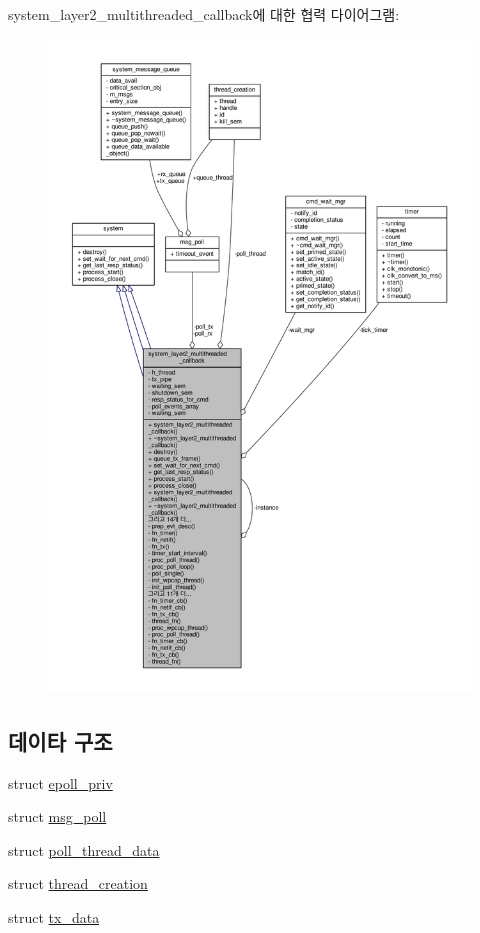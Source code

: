 system\+\_\+layer2\+\_\+multithreaded\+\_\+callback에 대한 협력 다이어그램\+:
\nopagebreak
\begin{figure}[H]
\begin{center}
\leavevmode
\includegraphics[width=350pt]{classavdecc__lib_1_1system__layer2__multithreaded__callback__coll__graph}
\end{center}
\end{figure}
\subsection*{데이타 구조}
\begin{DoxyCompactItemize}
\item 
struct \hyperlink{structavdecc__lib_1_1system__layer2__multithreaded__callback_1_1epoll__priv}{epoll\+\_\+priv}
\item 
struct \hyperlink{structavdecc__lib_1_1system__layer2__multithreaded__callback_1_1msg__poll}{msg\+\_\+poll}
\item 
struct \hyperlink{structavdecc__lib_1_1system__layer2__multithreaded__callback_1_1poll__thread__data}{poll\+\_\+thread\+\_\+data}
\item 
struct \hyperlink{structavdecc__lib_1_1system__layer2__multithreaded__callback_1_1thread__creation}{thread\+\_\+creation}
\item 
struct \hyperlink{structavdecc__lib_1_1system__layer2__multithreaded__callback_1_1tx__data}{tx\+\_\+data}
\end{DoxyCompactItemize}
